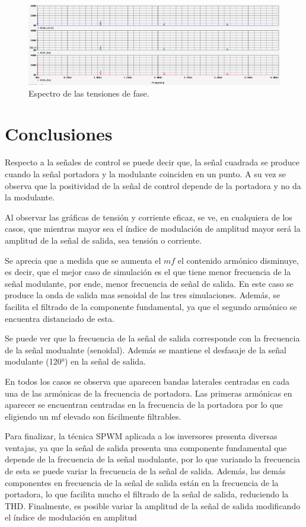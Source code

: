 \documentclass[11pt, a4paper]{article}
\begin{document}
\begin{figure}[h!]
\centering
\includegraphics[width=15cm]{Tercero/Espectro}
\caption{Espectro de las tensiones de fase.}
\label{fig:esp5.25}
\end{figure}




\clearpage
\section{Conclusiones}
Respecto a la señales de control se puede decir que, la señal cuadrada se produce cuando la señal portadora y la modulante coinciden en un punto. A su vez se observa que la positividad de la señal de control depende de la portadora y no da la modulante.

Al observar las gráficas de tensión y corriente eficaz, se ve, en cualquiera de los casos, que mientras mayor sea el índice de modulación de amplitud mayor será la amplitud de la señal de salida, sea tensión o corriente. 

Se aprecia que a medida que se aumenta el $mf$ el contenido armónico disminuye, es decir, que el mejor caso de simulación es el que tiene menor frecuencia de la señal modulante, por ende, menor frecuencia de señal de salida. En este caso se produce la onda de salida mas senoidal de las tres simulaciones. Además, se facilita el filtrado de la componente fundamental, ya que el segundo armónico se encuentra distanciado de esta.

Se puede ver que la frecuencia de la señal de salida corresponde con la frecuencia de la señal modualnte (senoidal). Además se mantiene el desfasaje de la señal modulante (120°) en la señal de salida.

En todos los casos se observa que aparecen bandas laterales centradas en cada una de las armónicas de la frecuencia de portadora. Las primeras armónicas en aparecer se encuentran centradas en la frecuencia de la portadora por lo que eligiendo un mf elevado son fácilmente filtrables.

Para finalizar, la técnica SPWM aplicada a los inversores presenta diversas ventajas, ya que la señal de salida presenta una componente fundamental que depende de la frecuencia de la señal modulante, por lo que variando la frecuencia de esta se puede variar la frecuencia de la señal de salida. Además, las demás componentes en frecuencia de la señal de salida están en la frecuencia de la portadora, lo que facilita mucho el filtrado de la señal de salida, reduciendo la THD. Finalmente, es posible variar la amplitud de la señal de salida modificando el índice de modulación en amplitud
\end{document}
